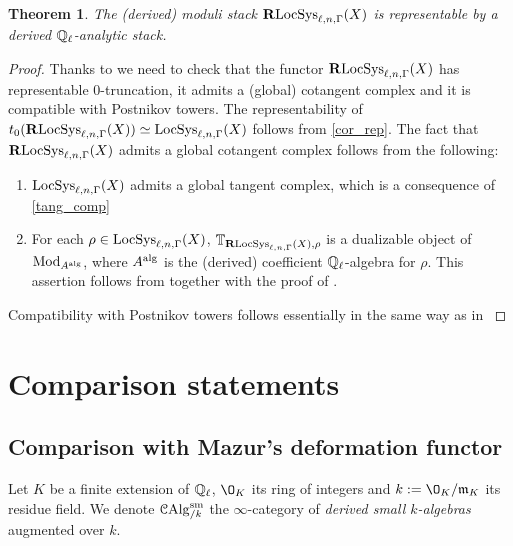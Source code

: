 \documentclass[10pt,a4paper]{amsart}
\numberwithin{equation}{subsection}
\theoremstyle{plain}
\newtheorem{theorem}{Theorem}[section]
\theoremstyle{definition}
\theoremstyle{remark}
\numberwithin{equation}{section}
\begin{document}
\begin{theorem}
The (derived) moduli stack $\mathbf R \mathrm{LocSys}_{\ell, n, \Gamma}(X)$ is representable by a derived $\mathbb{Q}_{\ell}$-analytic stack.
\end{theorem}

\begin{proof}
Thanks to \cite[Theorem 7.1]{porta_rep} we need to check that the functor $\mathbf R \mathrm{LocSys}_{\ell, n, \Gamma}(X)$ has representable $0$-truncation, it admits a (global) cotangent complex and it is compatible with Postnikov towers. The representability of $t_0(\mathbf R \mathrm{LocSys}_{\ell, n, \Gamma}(X) ) \simeq
\mathrm{LocSys}_{\ell, n, \Gamma}(X)$ follows from \cref{cor_rep}. The fact that $\mathbf R \mathrm{LocSys}_{\ell, n, \Gamma}(X)$ admits a global cotangent complex follows from the following:
	\begin{enumerate}
		\item $\mathrm{LocSys}_{\ell, n, \Gamma}(X)$ admits a global tangent complex, which is a consequence of \cref{tang_comp}
		\item For each $\rho \in \mathrm{LocSys}_{\ell, n, \Gamma}(X)$, $\mathbb T_{\mathbf R \mathrm{LocSys}_{\ell, n, \Gamma}(X), \rho}$ is a dualizable object of $\mathrm{Mod}_{A^{\mathrm{alg}}}$, where $A^{\mathrm{alg}}$ is the (derived) coefficient $\mathbb{Q}_{\ell}$-algebra for $\rho$. This assertion follows from \cite[Theorem 19.1]{milne_et}
		together with the proof of \cite[Proposition 3.1.7]{me1}.
	\end{enumerate}
Compatibility with Postnikov towers follows essentially in the same way as in \cite[Proposition 4.4.4. and Lemma 4.4.14.]{me1}
\end{proof}


\section{Comparison statements}

\subsection{Comparison with Mazur's deformation functor}
Let $K$ be a finite extension of $\mathbb{Q}_{\ell}$, $\O_K$ its ring of integers and $k := \O_K / \mathfrak{m}_K$ its residue field. We denote $\mathcal{C}\mathrm{Alg}_{/k}^{\mathrm{sm}}$ the $\infty$-category of \emph{derived small $k$-algebras} augmented over $k$.
\end{document}
